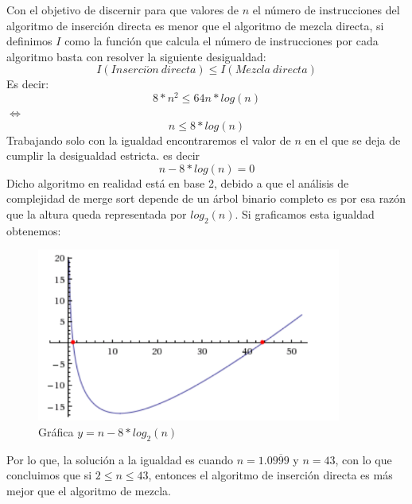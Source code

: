\documentclass[11pt]{article}
\begin{document}
\begin{enumerate}
  Con el objetivo de discernir para que valores de $n$ el número 
  de instrucciones del algoritmo de inserción directa es menor
  que el algoritmo de mezcla directa, si definimos $I$ como la función que calcula
  el número de instrucciones por cada algoritmo basta con resolver la siguiente desigualdad:
  \[
   I(Inserci\acute{o}n\ directa) \leq I( Mezcla \  directa)
  \]
  Es decir:
  \[
   8*n^2 \leq 64n*log(n)
  \]
  $\Longleftrightarrow$
  \[
   n \leq 8*log(n)
  \]
  Trabajando solo con la igualdad encontraremos el valor de $n$ en el que 
  se deja de cumplir la desigualdad estricta. es decir 
  \[
   n - 8*log(n) = 0
  \]
  Dicho algoritmo en realidad está en base 2, debido a que el análisis
  de complejidad de merge sort depende de un árbol binario completo
  es por esa razón que la altura queda representada por $log_2(n)$.
  Si graficamos esta igualdad obtenemos:
   \begin{figure}[H]
    \centering
  \includegraphics[trim=0cm 0cm 0cm 0cm, width=10cm]{ejercicio2_1.png} 
  \caption{Gráfica $y= n-8*log_2(n)$}
  \end{figure}
  
 
   Por lo que, la solución a la igualdad es cuando $n =1.0\overline{999}$ y $n=43$,
   con lo que concluimos que si $2 \leq n \leq 43$, entonces el
   algoritmo de inserción directa es más mejor que el algoritmo de mezcla.
   

  
  
  


  
  
  

  
 
  
  
  
 

\end{enumerate}
\end{document}
